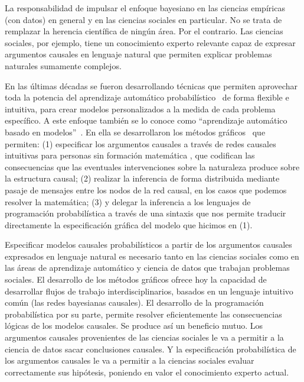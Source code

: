 \documentclass[a4paper,11pt]{book}
\theoremstyle{definition}
\begin{document}




La responsabilidad de impulsar el enfoque bayesiano en las ciencias empíricas (con datos) en general y en las ciencias sociales en particular.
%
No se trata de remplazar la herencia científica de ningún área.
%
Por el contrario.
%
Las ciencias sociales, por ejemplo, tiene un conocimiento experto relevante capaz de expresar argumentos causales en lenguaje natural que permiten explicar problemas naturales sumamente complejos.
%


En las últimas décadas se fueron desarrollando técnicas que permiten aprovechar toda la potencia del aprendizaje automático probabilístico~\cite{murphy-pmlBook1,murphy-pmlBook2} de forma flexible e intuitiva, para crear modelos personalizados a la medida de cada problema específico.
%
A este enfoque también se lo conoce como ``aprendizaje automático basado en modelos''~\cite{Bishop2013, Bishop2006}.
%
En ella se desarrollaron los métodos gráficos~\cite{pearl1986-beliefNetworks, kschischang2001-factorGraphsAndTheSumProductAlgorithm, koller2009-PGM} que permiten: (1) especificar los argumentos causales a través de redes causales intuitivas para personas sin formación matemática , que codifican las consecuencias que las eventuales intervenciones sobre la naturaleza produce sobre la estructura causal; (2) realizar la inferencia de forma distribuida mediante pasaje de mensajes entre los nodos de la red causal, en los casos que podemos resolver la matemática; (3) y delegar la inferencia a los lenguajes de programación probabilística a través de una sintaxis que nos permite traducir directamente la especificación gráfica del modelo que hicimos en (1).


Especificar modelos causales probabilísticos a partir de los argumentos causales expresados en lenguaje natural es necesario tanto en las ciencias sociales como en las áreas de aprendizaje automático y ciencia de datos que trabajan problemas sociales.
%
El desarrollo de los métodos gráficos ofrece hoy la capacidad de desarrollar flujos de trabajo interdisciplinarios, basados en un lenguaje intuitivo común (las redes bayesianas causales).
%
El desarrollo de la programación probabilística por su parte, permite resolver eficientemente las consecuencias lógicas de los modelos causales.
%
Se produce así un beneficio mutuo.
%
Los argumentos causales provenientes de las ciencias sociales le va a permitir a la ciencia de datos sacar conclusiones causales.
%
Y la especificación probabilística de los argumentos causales  le va a permitir a la ciencias sociales evaluar correctamente sus hipótesis, poniendo en valor el conocimiento experto actual.
\end{document}
